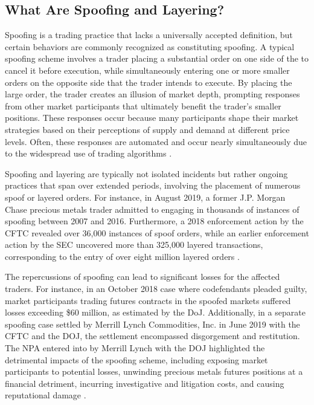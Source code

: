 \subsection{What Are Spoofing and Layering?}
Spoofing is a trading practice that lacks a universally accepted definition, but certain behaviors are commonly
recognized as constituting spoofing. A typical spoofing scheme involves a trader placing a substantial order on one side
of the to cancel it before execution, while simultaneously entering one or more smaller orders on the opposite side that
the trader intends to execute. By placing the large order, the trader creates an illusion of market depth, prompting
responses from other market participants that ultimately benefit the trader's smaller positions. These responses occur
because many participants shape their market strategies based on their perceptions of supply and demand at different
price levels. Often, these responses are automated and occur nearly simultaneously due to the widespread use of trading
algorithms \cite{corwin2012large, jarrow2011manipulation}.

Spoofing and layering are typically not isolated incidents but rather ongoing practices that span over extended periods,
involving the placement of numerous spoof or layered orders. For instance, in August 2019, a former J.P. Morgan Chase
precious metals trader admitted to engaging in thousands of instances of spoofing between 2007 and 2016. Furthermore, a
2018 enforcement action by the CFTC revealed over 36,000 instances of spoof orders, while an earlier enforcement action
by the SEC uncovered more than 325,000 layered transactions, corresponding to the entry of over eight million layered
orders \cite{cftc2018spoofing, sec2015spoofing}.

The repercussions of spoofing can lead to significant losses for the affected traders. For instance, in an October 2018
case where codefendants pleaded guilty, market participants trading futures contracts in the spoofed markets suffered
losses exceeding \$60 million, as estimated by the DoJ. Additionally, in a separate spoofing case settled by Merrill
Lynch Commodities, Inc. in June 2019 with the CFTC and the DOJ, the settlement encompassed disgorgement and restitution.
The NPA entered into by Merrill Lynch with the DOJ highlighted the detrimental impacts of the spoofing scheme, including
exposing market participants to potential losses, unwinding precious metals futures positions at a financial detriment,
incurring investigative and litigation costs, and causing reputational damage \cite{doj2018spoofing, cftc2019merrill}.

